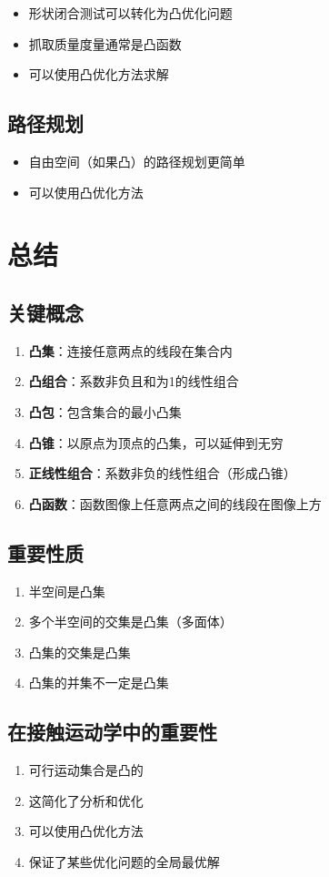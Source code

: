 \documentclass[12pt,a4paper]{article}
\begin{document}
\begin{itemize}
\item 形状闭合测试可以转化为凸优化问题
\item 抓取质量度量通常是凸函数
\item 可以使用凸优化方法求解
\end{itemize}

\subsection{路径规划}

\begin{itemize}
\item 自由空间（如果凸）的路径规划更简单
\item 可以使用凸优化方法
\end{itemize}

\section{总结}

\subsection{关键概念}

\begin{enumerate}
\item \textbf{凸集}：连接任意两点的线段在集合内

\item \textbf{凸组合}：系数非负且和为1的线性组合

\item \textbf{凸包}：包含集合的最小凸集

\item \textbf{凸锥}：以原点为顶点的凸集，可以延伸到无穷

\item \textbf{正线性组合}：系数非负的线性组合（形成凸锥）

\item \textbf{凸函数}：函数图像上任意两点之间的线段在图像上方
\end{enumerate}

\subsection{重要性质}

\begin{enumerate}
\item 半空间是凸集
\item 多个半空间的交集是凸集（多面体）
\item 凸集的交集是凸集
\item 凸集的并集不一定是凸集
\end{enumerate}

\subsection{在接触运动学中的重要性}

\begin{enumerate}
\item 可行运动集合是凸的
\item 这简化了分析和优化
\item 可以使用凸优化方法
\item 保证了某些优化问题的全局最优解
\end{enumerate}
\end{document}

